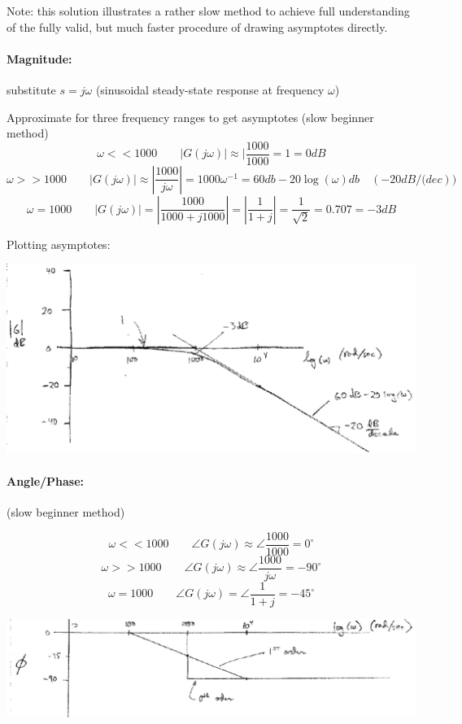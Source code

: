 \documentclass{article}	%
\begin{document}
\begin{solution}

Note: this solution illustrates a rather slow method to achieve full understanding of the fully valid, but much faster procedure of drawing asymptotes directly.

\paragraph{Magnitude:} substitute $s=j\omega$ (sinusoidal steady-state response at frequency $\omega$)

Approximate for three frequency ranges to get asymptotes (slow beginner method)
\[
\omega<<1000 \qquad |G(j\omega)| \approx |\frac{1000}{1000} = 1 = 0dB
\]
\[
\omega>>1000 \qquad |G(j\omega)| \approx |\frac{1000}{j\omega}| = 1000 \omega^{-1} = 60db - 20\log(\omega) db \quad (-20dB/\mathrm(dec))
\]
\[
\omega=1000 \qquad |G(j\omega)|    =     |\frac{1000}{1000+j1000}| = |\frac{1}{1+j}| = \frac{1}{\sqrt{2}} = 0.707 = -3dB
\]

Plotting asymptotes:

\includegraphics[width=6.5in]{00949a.png}

\paragraph{Angle/Phase:} (slow beginner method)

\[
\omega<<1000 \qquad \angle{G(j\omega)} \approx \angle{\frac{1000}{1000}} = 0^\circ
\]
\[
\omega>>1000 \qquad \angle{G(j\omega)} \approx \angle{\frac{1000}{j\omega}} = -90^\circ
\]
\[
\omega=1000 \qquad \angle{G(j\omega)}    =   \angle{\frac {1} {1+j}}= -45^\circ
\]

\includegraphics[width=6.5in]{00950a.png}

\end{solution}
\end{document}
